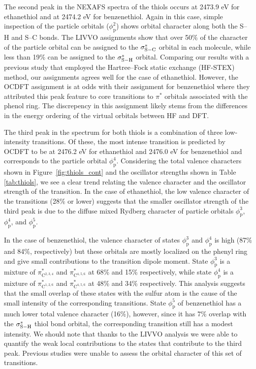 \documentclass{article}
\begin{document}
The second peak in the NEXAFS spectra of the thiols occurs at 2473.9 eV for  ethanethiol and at 2474.2 eV for benzenethiol. Again in this case, simple inspection of the particle orbitals ($\phi_\mathrm{p}^2$) shows orbital character along both the S--H and S--C bonds. The LIVVO assignments show that over 50\% of the character of the particle orbital can be assigned to the $\sigma^*_{\rm S-C}$ orbital in each molecule, while less than 19\% can be assigned to the $\sigma^*_{\rm S-H}$ orbital. Comparing our results with a previous study\cite{behyan_sulfur_2013} that employed the Hartree--Fock static exchange (HF-STEX) method, \cite{otero_nitrogen_2006,cooney_chemical_2004,urquhart_core_1997,urquhart_probing_1998,urquhart_near-edge_1999,kosugi_rydberg_1995} our assignments agrees well for the case of ethanethiol.
However, the OCDFT assignment is at odds with their assignment for benzenethiol where they attributed this peak feature to core transitions to $\pi^*$ orbitals associated with the phenol ring. The discrepency in this assignment likely stems from the differences in the energy ordering of the virtual orbitals between HF and DFT.

The third peak in the spectrum for both thiols is a combination of three low-intensity transitions. Of these, the most intense transition is predicted by OCDFT to be at 2476.2 eV for ethanethiol and 2476.0 eV for benzenethiol and corresponds to the particle orbital $\phi_\mathrm{p}^4$.
Considering the total valence characters shown in Figure~\ref{fig:thiols_cont} and the oscillator strengths shown in Table \ref{tab:thiols}, we see a clear trend relating the valence character and the oscillator strength of the transition.
In the case of ethanethiol, the low valence character of the transitions (28\% or lower) suggests that the smaller oscillator strength of the third peak is due to the diffuse mixed Rydberg character of particle orbitals $\phi_\mathrm{p}^3$, $\phi_\mathrm{p}^4$, and $\phi_\mathrm{p}^5$.

In the case of benzenethiol, the valence character of states $\phi_\mathrm{p}^3$ and $\phi_\mathrm{p}^4$ is high (87\% and 84\%, respectively) but these orbitals are mostly localized on the phenyl ring and give small contributions to the transition dipole moment.
State $\phi_\mathrm{p}^3$ is a mixture of $\pi^*_{\mathrm{C}^{2,3,4}}$ and $\pi^*_{\mathrm{C}^{4,5,6}}$ at 68\% and 15\% respectively, while state $\phi_\mathrm{p}^4$ is a mixture of $\pi^*_{\mathrm{C}^{1,2,6}}$ and $\pi^*_{\mathrm{C}^{4,5,6}}$ at 48\% and 34\% respectively.
This analysis suggests that the small overlap of these states with the sulfur atom is the cause of the small intensity of the corresponding transitions.
State $\phi_\mathrm{p}^5$ of benzenethiol has a much lower total valence character (16\%), however, since it has 7\% overlap with the $\sigma^*_{\rm S-H}$ thiol bond orbital, the corresponding transition still has a modest intensity.
We should note that thanks to the LIVVO analysis we were able to quantify the weak local contributions to the states that contribute to the third peak.
Previous studies\cite{behyan_sulfur_2013} were unable to assess the orbital character of this set of transitions.
\end{document}
